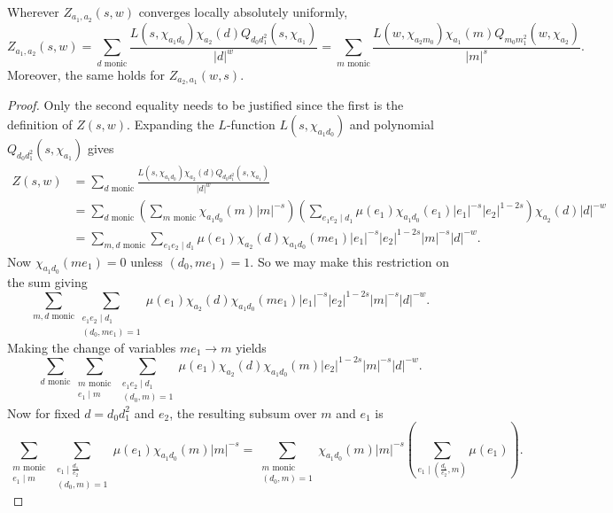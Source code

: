 \documentclass[12pt,reqno,oneside]{amsart}
\begin{document}
    \begin{theorem}[Interchange]
        Wherever $Z_{a_{1},a_{2}}(s,w)$ converges locally absolutely uniformly,
        \[
            Z_{a_{1},a_{2}}(s,w) = \sum_{\text{$d$ monic}}\frac{L(s,\chi_{a_{1}d_{0}})\chi_{a_{2}}(d)Q_{d_{0}d_{1}^{2}}(s,\chi_{a_{1}})}{|d|^{w}} = \sum_{\text{$m$ monic}}\frac{L(w,\chi_{a_{2}m_{0}})\chi_{a_{1}}(m)Q_{m_{0}m_{1}^{2}}(w,\chi_{a_{2}})}{|m|^{s}}.
        \]
        Moreover, the same holds for $Z_{a_{2},a_{1}}(w,s)$.
    \end{theorem}
    \begin{proof}
        Only the second equality needs to be justified since the first is the definition of $Z(s,w)$. Expanding the $L$-function $L(s,\chi_{a_{1}d_{0}})$ and polynomial $Q_{d_{0}d_{1}^{2}}(s,\chi_{a_{1}})$ gives
        \begin{align*}
            Z(s,w) &= \sum_{\text{$d$ monic}}\frac{L(s,\chi_{a_{1}d_{0}})\chi_{a_{2}}(d)Q_{d_{0}d_{1}^{2}}(s,\chi_{a_{1}})}{|d|^{w}} \\
            &= \sum_{\text{$d$ monic}}\left(\sum_{\text{$m$ monic}}\chi_{a_{1}d_{0}}(m)|m|^{-s}\right)\left(\sum_{e_{1}e_{2} \mid d_{1}}\mu(e_{1})\chi_{a_{1}d_{0}}(e_{1})|e_{1}|^{-s}|e_{2}|^{1-2s}\right)\chi_{a_{2}}(d)|d|^{-w} \\
            &= \sum_{\text{$m,d$ monic}}\sum_{e_{1}e_{2} \mid d_{1}}\mu(e_{1})\chi_{a_{2}}(d)\chi_{a_{1}d_{0}}(me_{1})|e_{1}|^{-s}|e_{2}|^{1-2s}|m|^{-s}|d|^{-w}.
        \end{align*}
        Now $\chi_{a_{1}d_{0}}(me_{1}) = 0$ unless $(d_{0},me_{1}) = 1$. So we may make this restriction on the sum giving
        \[
            \sum_{\text{$m,d$ monic}}\sum_{\substack{e_{1}e_{2} \mid d_{1} \\ (d_{0},me_{1}) = 1}}\mu(e_{1})\chi_{a_{2}}(d)\chi_{a_{1}d_{0}}(me_{1})|e_{1}|^{-s}|e_{2}|^{1-2s}|m|^{-s}|d|^{-w}.
        \]
        Making the change of variables $me_{1} \to m$ yields
        \[
            \sum_{\text{$d$ monic}}\sum_{\substack{\text{$m$ monic} \\ e_{1} \mid m}}\sum_{\substack{e_{1}e_{2} \mid d_{1} \\ (d_{0},m) = 1}}\mu(e_{1})\chi_{a_{2}}(d)\chi_{a_{1}d_{0}}(m)|e_{2}|^{1-2s}|m|^{-s}|d|^{-w}.
        \]
        Now for fixed $d = d_{0}d_{1}^{2}$ and $e_{2}$, the resulting subsum over $m$ and $e_{1}$ is
        \[
            \sum_{\substack{\text{$m$ monic} \\ e_{1} \mid m}}\sum_{\substack{e_{1} \mid \frac{d_{1}}{e_{2}} \\ (d_{0},m) = 1}}\mu(e_{1})\chi_{a_{1}d_{0}}(m)|m|^{-s} = \sum_{\substack{\text{$m$ monic} \\ (d_{0},m) = 1}}\chi_{a_{1}d_{0}}(m)|m|^{-s}\left(\sum_{e_{1} \mid \left(\frac{d_{1}}{e_{2}},m\right)}\mu(e_{1})\right).
\]
\end{proof}
\end{document}
